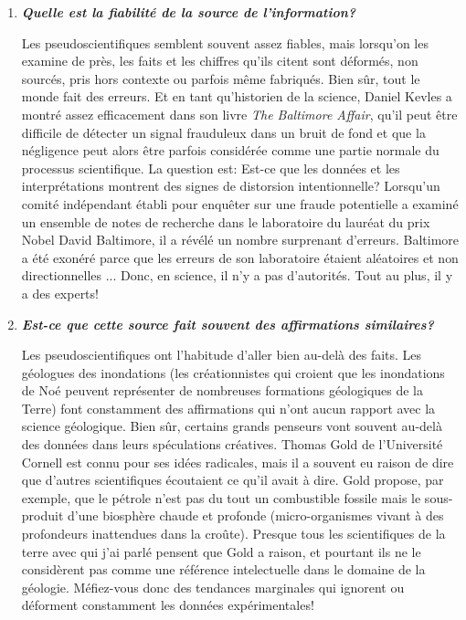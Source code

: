 	\begin{enumerate}
		\item \textit{\textbf{Quelle est la fiabilité de la source de l'information?}}

		Les pseudoscientifiques semblent souvent assez fiables, mais lorsqu'on les examine de près, les faits et les chiffres qu'ils citent sont déformés, non sourcés, pris hors contexte ou parfois même fabriqués. Bien sûr, tout le monde fait des erreurs. Et en tant qu'historien de la science, Daniel Kevles a montré assez efficacement dans son livre \textit{The Baltimore Affair}, qu'il peut être difficile de détecter un signal frauduleux dans un bruit de fond et que la négligence peut alors être parfois considérée comme une partie normale du processus scientifique. La question est: Est-ce que les données et les interprétations montrent des signes de distorsion intentionnelle? Lorsqu'un comité indépendant établi pour enquêter sur une fraude potentielle a examiné un ensemble de notes de recherche dans le laboratoire du lauréat du prix Nobel David Baltimore, il a révélé un nombre surprenant d'erreurs. Baltimore a été exonéré parce que les erreurs de son laboratoire étaient aléatoires et non directionnelles ... Donc, en science, il n'y a pas d'autorités. Tout au plus, il y a des experts!

		\item \textit{\textbf{Est-ce que cette source fait souvent des affirmations similaires?}}

		Les pseudoscientifiques ont l'habitude d'aller bien au-delà des faits. Les géologues des inondations (les créationnistes qui croient que les inondations de Noé peuvent représenter de nombreuses formations géologiques de la Terre) font constamment des affirmations qui n'ont aucun rapport avec la science géologique. Bien sûr, certains grands penseurs vont souvent au-delà des données dans leurs spéculations créatives. Thomas Gold de l'Université Cornell est connu pour ses idées radicales, mais il a souvent eu raison de dire que d'autres scientifiques écoutaient ce qu'il avait à dire. Gold propose, par exemple, que le pétrole n'est pas du tout un combustible fossile mais le sous-produit d'une biosphère chaude et profonde (micro-organismes vivant à des profondeurs inattendues dans la croûte). Presque tous les scientifiques de la terre avec qui j'ai parlé pensent que Gold a raison, et pourtant ils ne le considèrent pas comme une référence intelectuelle dans le domaine de la géologie. Méfiez-vous donc des tendances marginales qui ignorent ou déforment constamment les données expérimentales!


\end{enumerate}
